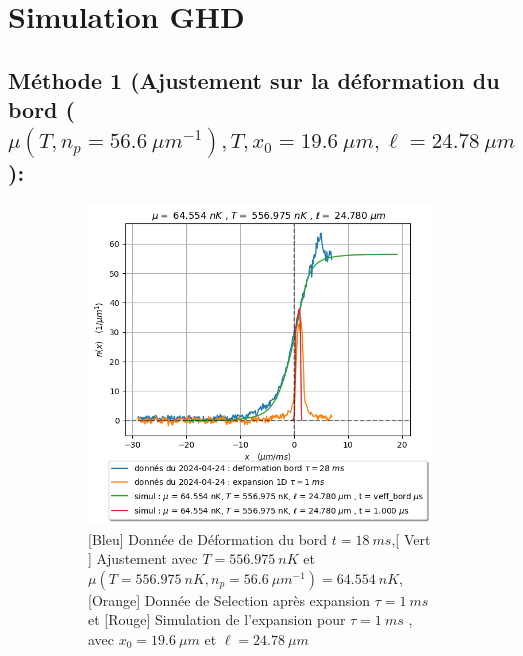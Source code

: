 \documentclass[a3, 10pt,twoside]{article}          %
\theoremstyle{plain}
\theoremstyle{definition}
\theoremstyle{remark}
\theoremstyle{definition} %
\begin{document}
	\section{Simulation GHD}

	
		\subsection{Méthode 1 (Ajustement sur la déformation du bord ($\mu( T , n_p = 56.6 ~{\mu m}^{-1} ) , T , x_0 = 19.6 ~\mu m  , \ell = 24.78 ~ \mu m  $ ): } 
		
		
		
		\begin{figure}[H]
			\begin{subfigure}[b]{0.45\textwidth}
        		\centering
        		\includegraphics[width=\textwidth]{Figures/simul_deformation_18_24-04-2024}
        		\caption{{\color{blue} [Bleu] Donnée de Déformation du bord $t= 18 ~ms$},{\color{OliveGreen}[ Vert ]  Ajustement avec $T = 556.975 ~nK$ et $\mu ( T =556.975 ~nK  , n_p = 56.6 ~{\mu m}^{-1} )= 64.554~nK$}, {\color{orange}[Orange] Donnée de Selection après expansion $\tau = 1~ms$} et {\color{red}[Rouge] Simulation de l'expansion pour $\tau= 1~ms$  , avec $x_0 = 19.6~\mu m$ et $\ell = 24.78~\mu m$ }  }
        		\label{fig:ajustementdeform}
    		\end{subfigure}
    		\hfill
    		\begin{subfigure}[b]{0.45\textwidth}

\end{subfigure}
\end{figure}
\end{document}

